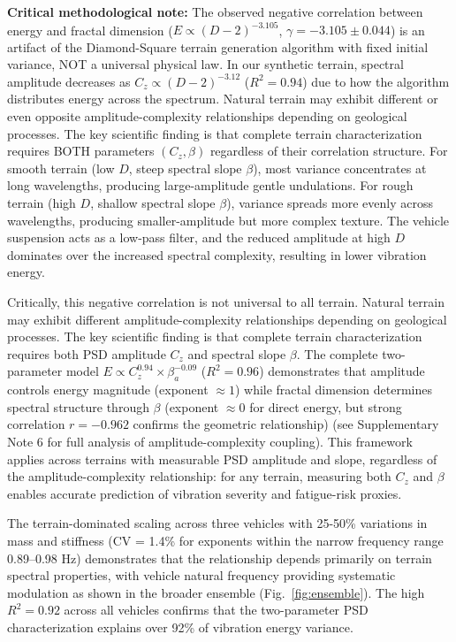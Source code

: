 \documentclass[11pt]{article}
\begin{document}
\textbf{Critical methodological note:} The observed negative correlation between energy and fractal dimension ($E \propto (D-2)^{-3.105}$, $\gamma = -3.105 \pm 0.044$) is an artifact of the Diamond-Square terrain generation algorithm with fixed initial variance, NOT a universal physical law. In our synthetic terrain, spectral amplitude decreases as $C_z \propto (D-2)^{-3.12}$ ($R^2 = 0.94$) due to how the algorithm distributes energy across the spectrum. Natural terrain may exhibit different or even opposite amplitude-complexity relationships depending on geological processes. The key scientific finding is that complete terrain characterization requires BOTH parameters $(C_z, \beta)$ regardless of their correlation structure. For smooth terrain (low $D$, steep spectral slope $\beta$), most variance concentrates at long wavelengths, producing large-amplitude gentle undulations. For rough terrain (high $D$, shallow spectral slope $\beta$), variance spreads more evenly across wavelengths, producing smaller-amplitude but more complex texture. The vehicle suspension acts as a low-pass filter, and the reduced amplitude at high $D$ dominates over the increased spectral complexity, resulting in lower vibration energy.

Critically, this negative correlation is not universal to all terrain. Natural terrain may exhibit different amplitude-complexity relationships depending on geological processes. The key scientific finding is that complete terrain characterization requires both PSD amplitude $C_z$ and spectral slope $\beta$. The complete two-parameter model $E \propto C_z^{0.94} \times \beta_a^{-0.09}$ ($R^2 = 0.96$) demonstrates that amplitude controls energy magnitude (exponent $\approx 1$) while fractal dimension determines spectral structure through $\beta$ (exponent $\approx 0$ for direct energy, but strong correlation $r=-0.962$ confirms the geometric relationship) (see Supplementary Note 6 for full analysis of amplitude-complexity coupling). This framework applies across terrains with measurable PSD amplitude and slope, regardless of the amplitude-complexity relationship: for any terrain, measuring both $C_z$ and $\beta$ enables accurate prediction of vibration severity and fatigue-risk proxies.

The terrain-dominated scaling across three vehicles with 25-50\% variations in mass and stiffness (CV = 1.4\% for exponents within the narrow frequency range 0.89--0.98 Hz) demonstrates that the relationship depends primarily on terrain spectral properties, with vehicle natural frequency providing systematic modulation as shown in the broader ensemble (Fig.~\ref{fig:ensemble}). The high $R^2 = 0.92$ across all vehicles confirms that the two-parameter PSD characterization explains over 92\% of vibration energy variance.
\end{document}
